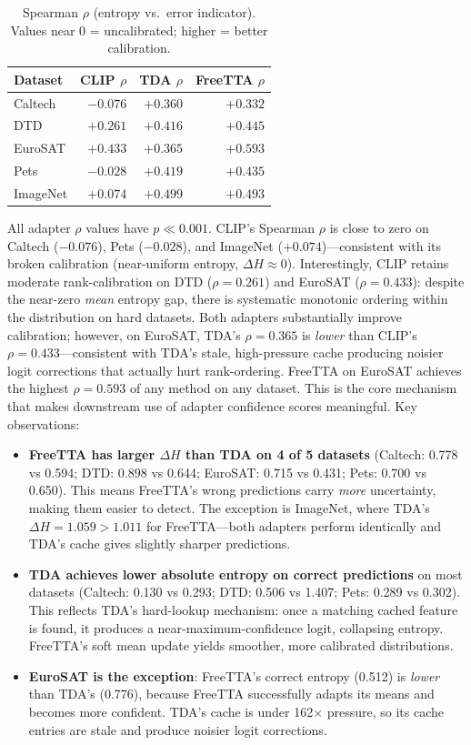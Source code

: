 \documentclass[12pt,a4paper]{article}
\newcommand{\1}{\mathbf{1}}
\begin{document}
\begin{table}[H]
\centering
\caption{Spearman $\rho$ (entropy vs.\ error indicator). Values near 0 = uncalibrated; higher = better calibration.}
\label{tab:spearman_rho}
\begin{tabular}{@{}lrrr@{}}
\toprule
Dataset & CLIP $\rho$ & TDA $\rho$ & FreeTTA $\rho$ \\
\midrule
Caltech  & $-0.076$ & $+0.360$ & $+0.332$ \\
DTD      & $+0.261$ & $+0.416$ & $+0.445$ \\
EuroSAT  & $+0.433$ & $+0.365$ & $+0.593$ \\
Pets     & $-0.028$ & $+0.419$ & $+0.435$ \\
ImageNet & $+0.074$ & $+0.499$ & $+0.493$ \\
\bottomrule
\end{tabular}
\end{table}

All adapter $\rho$ values have $p \ll 0.001$.
CLIP's Spearman $\rho$ is close to zero on Caltech ($-0.076$), Pets ($-0.028$), and ImageNet ($+0.074$)---consistent with its broken calibration (near-uniform entropy, $\Delta H \approx 0$).
Interestingly, CLIP retains moderate rank-calibration on DTD ($\rho = 0.261$) and EuroSAT ($\rho = 0.433$): despite the near-zero \emph{mean} entropy gap, there is systematic monotonic ordering within the distribution on hard datasets.
Both adapters substantially improve calibration; however, on EuroSAT, TDA's $\rho = 0.365$ is \emph{lower} than CLIP's $\rho = 0.433$---consistent with TDA's stale, high-pressure cache producing noisier logit corrections that actually hurt rank-ordering.
FreeTTA on EuroSAT achieves the highest $\rho = 0.593$ of any method on any dataset.
This is the core mechanism that makes downstream use of adapter confidence scores meaningful.
Key observations:
\begin{itemize}
  \item \textbf{FreeTTA has larger $\Delta H$ than TDA on 4 of 5 datasets}
  (Caltech: 0.778 vs 0.594; DTD: 0.898 vs 0.644; EuroSAT: 0.715 vs 0.431; Pets: 0.700 vs 0.650).
  This means FreeTTA's wrong predictions carry \emph{more} uncertainty, making them easier to detect.
  The exception is ImageNet, where TDA's $\Delta H = 1.059 > 1.011$ for FreeTTA---both adapters
  perform identically and TDA's cache gives slightly sharper predictions.

  \item \textbf{TDA achieves lower absolute entropy on correct predictions} on most datasets
  (Caltech: 0.130 vs 0.293; DTD: 0.506 vs 1.407; Pets: 0.289 vs 0.302).
  This reflects TDA's hard-lookup mechanism: once a matching cached feature is found, it produces
  a near-maximum-confidence logit, collapsing entropy.
  FreeTTA's soft mean update yields smoother, more calibrated distributions.

  \item \textbf{EuroSAT is the exception}: FreeTTA's correct entropy (0.512) is \emph{lower} than
  TDA's (0.776), because FreeTTA successfully adapts its means and becomes more confident.
  TDA's cache is under 162$\times$ pressure, so its cache entries are stale and produce
  noisier logit corrections.
\end{itemize}
\end{document}
